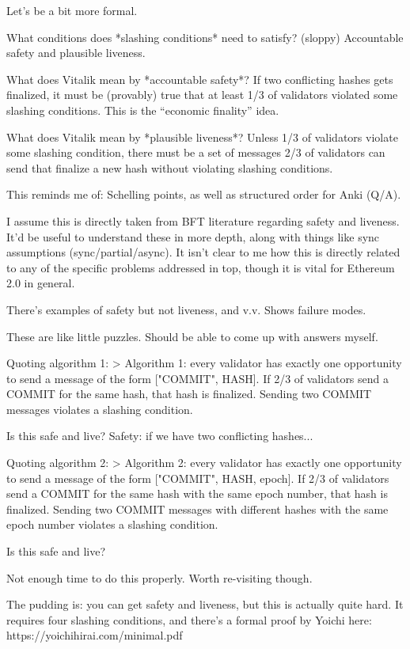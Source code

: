 \documentclass[12pt]{report}
\begin{document}
Let's be a bit more formal.

What conditions does *slashing conditions* need to satisfy? (sloppy)
Accountable safety and plausible liveness.

What does Vitalik mean by *accountable safety*?
If two conflicting hashes gets finalized, it must be (provably) true that at
least 1/3 of validators violated some slashing conditions. This is the
``economic finality'' idea.

What does Vitalik mean by *plausible liveness*?
Unless 1/3 of validators violate some slashing condition, there must be a set of
messages 2/3 of validators can send that finalize a new hash without violating
slashing conditions.

This reminds me of: Schelling points, as well as structured order for Anki (Q/A).

I assume this is directly taken from BFT literature regarding safety and
liveness. It'd be useful to understand these in more depth, along with things
like sync assumptions (sync/partial/async). It isn't clear to me how this is
directly related to any of the specific problems addressed in top, though it is
vital for Ethereum 2.0 in general.

There's examples of safety but not liveness, and v.v. Shows failure modes.

These are like little puzzles. Should be able to come up with answers myself.

Quoting algorithm 1:
> Algorithm 1: every validator has exactly one opportunity to send a message of
the form ["COMMIT", HASH]. If 2/3 of validators send a COMMIT for the same hash,
that hash is finalized. Sending two COMMIT messages violates a slashing
condition.

Is this safe and live? Safety: if we have two conflicting hashes...

Quoting algorithm 2:
> Algorithm 2: every validator has exactly one opportunity to send a message of
the form ["COMMIT", HASH, epoch]. If 2/3 of validators send a COMMIT for the
same hash with the same epoch number, that hash is finalized. Sending two COMMIT
messages with different hashes with the same epoch number violates a slashing
condition.

Is this safe and live?

Not enough time to do this properly. Worth re-visiting though.

The pudding is: you can get safety and liveness, but this is actually quite
hard. It requires four slashing conditions, and there's a formal proof by Yoichi
here: https://yoichihirai.com/minimal.pdf
\end{document}
